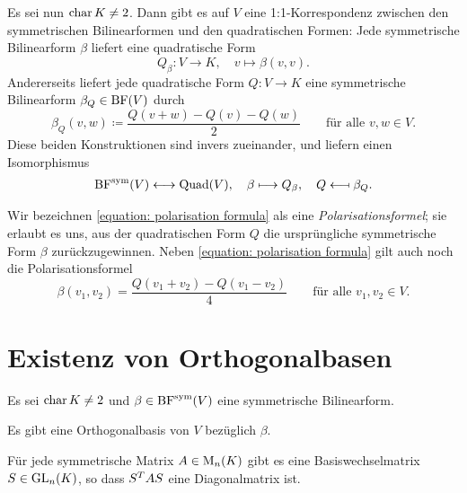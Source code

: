 Es sei nun $\operatorname{char} K \neq 2$.
Dann gibt es auf $V$ eine 1:1-Korrespondenz zwischen den symmetrischen Bilinearformen und den quadratischen Formen:
Jede symmetrische Bilinearform $\beta$ liefert eine quadratische Form
\[
          Q_\beta
  \colon  V
  \to     K,
  \quad   v
  \mapsto \beta(v,v).
\]
Andererseits liefert jede quadratische Form $Q \colon V \to K$ eine symmetrische Bilinearform $\beta_Q \in \operatorname{BF}(V)$ durch
\begin{equation}
  \label{equation: polarisation formula}
            \beta_Q(v,w)
  \coloneqq \frac{Q(v+w) - Q(v) - Q(w)}{2}
  \qquad
  \text{für alle $v, w \in V$}.
\end{equation}
Diese beiden Konstruktionen sind invers zueinander, und liefern einen Isomorphismus
\begin{align*}
                      \operatorname{BF}^{\operatorname{sym}}(V)
  \longleftrightarrow \operatorname{Quad}(V),
  \quad
                      \beta
  \longmapsto         Q_\beta,
  \quad
                      Q
  \longmapsfrom       \beta_Q.
\end{align*}

Wir bezeichnen \eqref{equation: polarisation formula} als eine \emph{Polarisationsformel};
sie erlaubt es uns, aus der quadratischen Form $Q$ die ursprüngliche symmetrische Form $\beta$ zurückzugewinnen.
Neben \eqref{equation: polarisation formula} gilt auch noch die Polarisationsformel
\[
    \beta(v_1, v_2)
  = \frac{Q(v_1 + v _2) - Q(v_1 - v_2)}{4}
  \qquad
  \text{für alle $v_1, v_2 \in V$}.
\]





\section{Existenz von Orthogonalbasen}

Es sei $\operatorname{char} K \neq 2$ und $\beta \in \operatorname{BF}^{\operatorname{sym}}(V)$ eine symmetrische Bilinearform.

\begin{theorem}
  \label{theorem: exstience of an orthogonal basis}
  Es gibt eine Orthogonalbasis von $V$ bezüglich $\beta$.
\end{theorem}

\begin{corollary}
  \label{corollary: every symmetric matrix is congruent to a diagonal matrix}
  Für jede symmetrische Matrix $A \in \operatorname{M}_{n}(K)$ gibt es eine Basiswechselmatrix $S \in \operatorname{GL}_{n}(K)$, so dass $S^T A S$ eine Diagonalmatrix ist.
\end{corollary}


